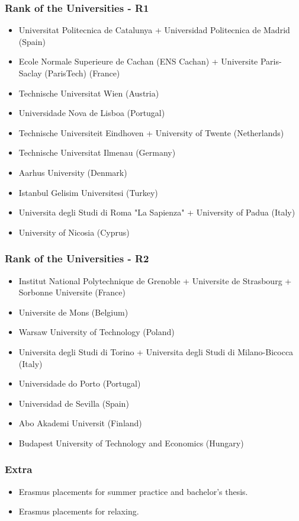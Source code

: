 \begin{frame}
    \frametitle{Rank of the Universities - R1}
    \begin{itemize}
        \item Universitat Politecnica de Catalunya + Universidad Politecnica de Madrid (Spain)
        \item Ecole Normale Superieure de Cachan (ENS Cachan) + Universite Paris-Saclay (ParisTech) (France)
        \item Technische Universitat Wien (Austria)
        \item Universidade Nova de Lisboa (Portugal)
        \item Technische Universiteit Eindhoven + University of Twente (Netherlands)
        \item Technische Universitat Ilmenau (Germany)
        \item Aarhus University (Denmark)
        \item Istanbul Gelisim Universitesi (Turkey)
        \item Universita degli Studi di Roma "La Sapienza" + University of Padua (Italy)
        \item University of Nicosia (Cyprus)
    \end{itemize}
\end{frame}

\begin{frame}
    \frametitle{Rank of the Universities - R2}
    \begin{itemize}
        \item Institut National Polytechnique de Grenoble + Universite de Strasbourg + Sorbonne Universite (France)
        \item Universite de Mons (Belgium)
        \item Warsaw University of Technology (Poland)
        \item Universita degli Studi di Torino + Universita degli Studi di Milano-Bicocca (Italy)
        \item Universidade do Porto (Portugal)
        \item Universidad de Sevilla (Spain)
        \item Abo Akademi Universit (Finland)
        \item Budapest University of Technology and Economics (Hungary)
    \end{itemize}
\end{frame}

\begin{frame}
    \frametitle{Extra}
    \begin{itemize}
        \item Erasmus placements for summer practice and bachelor's thesis.
        \item Erasmus placements for relaxing.
    \end{itemize}
\end{frame}



